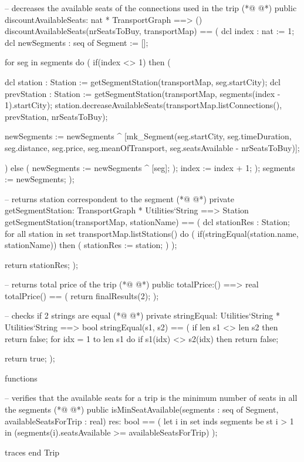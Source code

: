 \begin{vdmpp}[breaklines=true]
 -- decreases the available seats of the connections used in the trip
(*@
\label{discountAvailableSeats:73}
@*)
 public discountAvailableSeats: nat * TransportGraph ==> ()
 discountAvailableSeats(nrSeatsToBuy, transportMap) ==
 (
  dcl index : nat := 1;
  dcl newSegments : seq of Segment := [];
   
  for seg in segments do (
   if(index <> 1) then (
   
    dcl station : Station := getSegmentStation(transportMap, seg.startCity);
    dcl prevStation : Station := getSegmentStation(transportMap, segments(index - 1).startCity);
    station.decreaseAvailableSeats(transportMap.listConnections(), prevStation, nrSeatsToBuy);
     
    newSegments := newSegments ^
    [mk_Segment(seg.startCity, seg.timeDuration, seg.distance, seg.price, seg.meanOfTransport, seg.seatsAvailable - nrSeatsToBuy)];
   
   ) else (
    newSegments := newSegments ^ [seg];
   );
   index := index + 1;
  );
  segments := newSegments;
 );
 
 -- returns station correspondent to the segment
(*@
\label{getSegmentStation:98}
@*)
 private getSegmentStation: TransportGraph * Utilities`String ==> Station 
 getSegmentStation(transportMap, stationName) ==
 (
  dcl stationRes : Station;
  for all station in set transportMap.listStations() do (
   if(stringEqual(station.name, stationName)) then (
    stationRes := station;
   )
  );
  
  return stationRes;
 );
 
 -- returns total price of the trip
(*@
\label{totalPrice:112}
@*)
 public totalPrice:() ==> real
 totalPrice() ==
 (
  return finalResults(2);
 );
 
 -- checks if 2 strings are equal
(*@
\label{stringEqual:119}
@*)
 private stringEqual: Utilities`String * Utilities`String ==> bool
 stringEqual(s1, s2) ==
 (
  if len s1 <> len s2 then
   return false;
  for idx = 1 to len s1 do
   if s1(idx) <> s2(idx) then return false;
  
  return true;
 );

functions
 
 -- verifies that the available seats for a trip is the minimum number of seats in all the segments
(*@
\label{isMinSeatAvailable:133}
@*)
 public isMinSeatAvailable(segments : seq of Segment, availableSeatsForTrip : real) res: bool ==
 (
  let i in set inds segments be st i > 1 in (segments(i).seatsAvailable >=  availableSeatsForTrip)
 ); 

 
traces
end Trip
\end{vdmpp}
